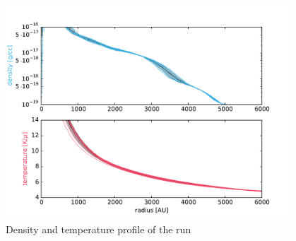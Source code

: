 \begin{figure}[!htb]
 \centering
 \includegraphics[width=0.95\textwidth]{Figures/var_rt_profiles/timeave_n100c01_6000AU}
 \captionsetup{justification=justified,singlelinecheck=false,width=\linewidth}
 \decoRule
 \caption[ profiles]{Density and temperature profile of the  run}
\label{fig:n100c0.1_profile}
\end{figure}
\FloatBarrier

